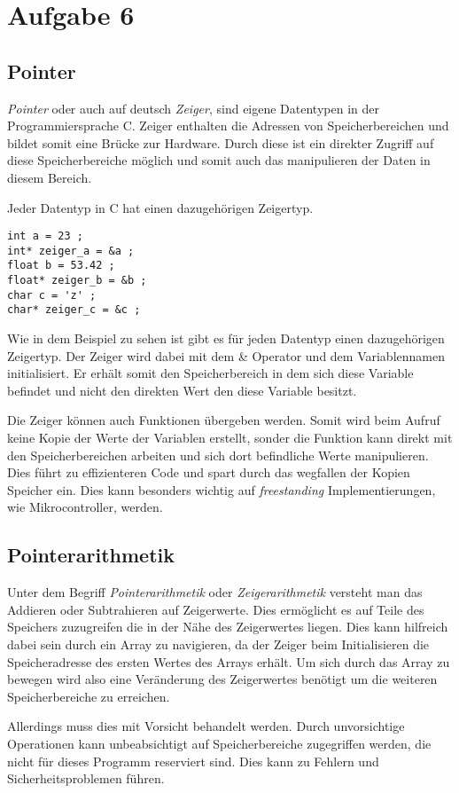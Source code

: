 \chapter{Aufgabe 6}
\section{Pointer}
\textit{Pointer} oder auch auf deutsch \textit{Zeiger}, sind eigene Datentypen in der Programmiersprache C.
Zeiger enthalten die Adressen von Speicherbereichen und bildet somit eine Brücke zur Hardware.
Durch diese ist ein direkter Zugriff auf diese Speicherbereiche möglich und somit auch das manipulieren der Daten in diesem Bereich.\par
Jeder Datentyp in C hat einen dazugehörigen Zeigertyp\cite{bökelmann:2023}.\par

\begin{lstlisting}
int a = 23 ;
int* zeiger_a = &a ;
float b = 53.42 ;
float* zeiger_b = &b ;
char c = 'z' ;
char* zeiger_c = &c ;
\end{lstlisting}

Wie in dem Beispiel zu sehen ist gibt es für jeden Datentyp einen dazugehörigen Zeigertyp.
Der Zeiger wird dabei mit dem & Operator und dem Variablennamen initialisiert.
Er erhält somit den Speicherbereich in dem sich diese Variable befindet und nicht den direkten Wert den diese Variable besitzt.\par
Die Zeiger können auch Funktionen übergeben werden.
Somit wird beim Aufruf keine Kopie der Werte der Variablen erstellt, sonder die Funktion kann direkt mit den Speicherbereichen arbeiten und sich dort befindliche Werte manipulieren.
Dies führt zu effizienteren Code und spart durch das wegfallen der Kopien Speicher ein.
Dies kann besonders wichtig auf \textit{freestanding} Implementierungen, wie Mikrocontroller, werden.\cite{bökelmann:2023}\par

\section{Pointerarithmetik}
Unter dem Begriff \textit{Pointerarithmetik} oder \textit{Zeigerarithmetik} versteht man das Addieren oder Subtrahieren auf Zeigerwerte.
Dies ermöglicht es auf Teile des Speichers zuzugreifen die in der Nähe des Zeigerwertes liegen.
Dies kann hilfreich dabei sein durch ein Array zu navigieren, da der Zeiger beim Initialisieren die Speicheradresse des ersten Wertes des Arrays erhält.
Um sich durch das Array zu bewegen wird also eine Veränderung des Zeigerwertes benötigt um die weiteren Speicherbereiche zu erreichen.\par
Allerdings muss dies mit Vorsicht behandelt werden.
Durch unvorsichtige Operationen kann unbeabsichtigt auf Speicherbereiche zugegriffen werden, die nicht für dieses Programm reserviert sind.
Dies kann zu Fehlern und Sicherheitsproblemen führen\cite{bökelmann:2023}.

